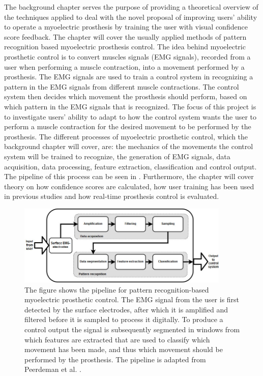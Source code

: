 The background chapter serves the purpose of providing a theoretical overview of the techniques applied to deal with the novel proposal of improving users' ability to operate a myoelectric prosthesis by training the user with visual confidence score feedback. The chapter will cover the usually applied methods of pattern recognition based myoelectric prosthesis control. The idea behind myoelectric prosthetic control is to  convert muscles signals (EMG signals), recorded from a user when performing a muscle contraction, into a movement performed by a prosthesis. The EMG signals are used to train a control system in recognizing a pattern in the EMG signals from different muscle contractions. The control system then decides which movement the prosthesis should perform, based on which pattern in the EMG signals that is recognized. The focus of this project is to investigate users' ability to adapt to how the control system wants the user to perform a muscle contraction for the desired movement to be performed by the prosthesis. The different processes of myoelectric prosthetic control, which the background chapter will cover, are: the mechanics of the movements the control system will be trained to recognize, the generation of EMG signals, data acquisition, data processing, feature extraction, classification and control output. The pipeline of this process can be seen in . Furthermore, the chapter will cover theory on how confidence scores are calculated, how user training has been used in previous studies and how real-time prosthesis control is evaluated.

\begin{figure}[H] 
	\includegraphics[width=0.9\textwidth]{figures/xBackground/prosthesis_control_pipeline}
	\caption{The figure shows the pipeline for pattern recognition-based myoelectric prosthetic control. The EMG signal from the user is first detected by the surface electrodes, after which it is amplified and filtered before it is sampled to process it digitally. To produce a control output the signal is subsequently segmented in windows from which features are extracted that are used to classify which movement has been made, and thus which movement should be performed by the prosthesis. The pipeline is adapted from Peerdeman et al. \cite{Peerdeman2011}.}
	\label{fig:prothesis_control_pipeline}
\end{figure}